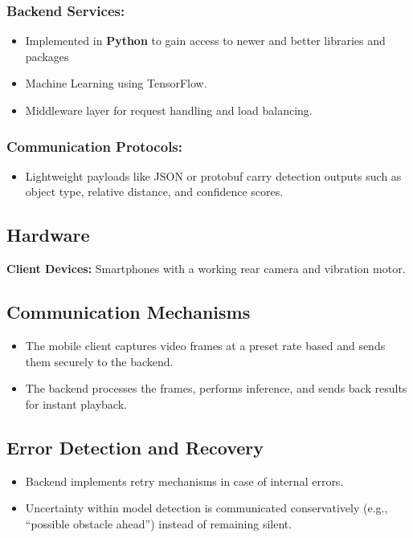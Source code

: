\documentclass{FastFyp}
\begin{document}
\subsubsection{Backend Services:}
\begin{itemize}
  \item Implemented in \textbf{Python} to gain access to newer and better libraries and packages
  \item Machine Learning using TensorFlow.
  \item Middleware layer for request handling and load balancing.
\end{itemize}

\subsubsection{Communication Protocols:}
\begin{itemize}
  \item Lightweight payloads like JSON or protobuf carry detection outputs such as object type, relative distance, and confidence scores.
\end{itemize}

\subsection{Hardware}
\textbf{Client Devices:} Smartphones with a working rear camera and vibration motor.

\subsection{Communication Mechanisms}
\begin{itemize}
  \item The mobile client captures video frames at a preset rate based and sends them securely to the backend.
  \item The backend processes the frames, performs inference, and sends back results for instant playback.
\end{itemize}

\subsection{Error Detection and Recovery}
\begin{itemize}
  \item Backend implements retry mechanisms in case of internal errors.
  \item Uncertainty within model detection is communicated conservatively (e.g., ``possible obstacle ahead'') instead of remaining silent.
\end{itemize}
\end{document}

